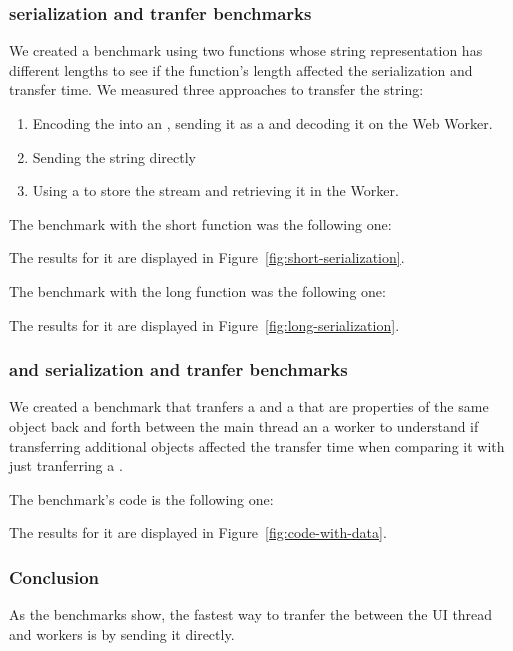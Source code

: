 \subsubsection{\tstring{} serialization and tranfer benchmarks}
We created a benchmark using two functions whose string representation has different lengths to see if the function's length affected the serialization and transfer time. We measured three approaches to transfer the string:
\begin{enumerate}
  \item Encoding the \tstring{} into an \tabuffer{}, sending it as a  and decoding it on the Web Worker.
  \item Sending the string directly
  \item Using a  to store the stream and retrieving it in the Worker.
\end{enumerate}

The benchmark with the short function was the following one:

The results for it are displayed in Figure~\ref{fig:short-serialization}.

The benchmark with the long function was the following one:

The results for it are displayed in Figure~\ref{fig:long-serialization}.

\subsubsection{\tstring{} and \ttarray{} serialization and tranfer benchmarks}
We created a benchmark that tranfers a \ttarray{} and a \tstring{} that are properties of the same object back and forth between the main thread an a worker to understand if transferring additional objects affected the transfer time when comparing it with just tranferring a \tstring{}.

The benchmark's code is the following one:

The results for it are displayed in Figure~\ref{fig:code-with-data}.

\subsubsection{Conclusion}
As the benchmarks show, the fastest way to tranfer the \tstring{} between the UI thread and workers is by sending it directly.

\pagebreak